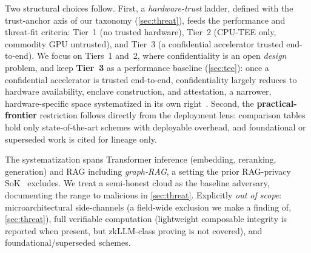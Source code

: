 Two structural choices follow. First, a \emph{hardware-trust} ladder, defined with the
trust-anchor axis of our taxonomy (\cref{sec:threat}), feeds the performance and
threat-fit criteria: Tier~1 (no trusted hardware), Tier~2 (CPU-TEE only, commodity GPU
untrusted), and Tier~3 (a confidential accelerator trusted end-to-end). We focus on
Tiers~1 and~2, where confidentiality is an open \emph{design} problem, and keep
\textbf{Tier~3} as a performance baseline (\cref{sec:tee}): once a confidential
accelerator is trusted end-to-end, confidentiality largely reduces to hardware
availability, enclave construction, and attestation, a narrower, hardware-specific
space systematized in its own right~\citep{accel_tee_sok}. Second, the
\textbf{practical-frontier} restriction follows directly from the deployment lens:
comparison tables hold only state-of-the-art schemes with deployable overhead, and
foundational or superseded work is cited for lineage only.

The systematization spans Transformer inference (embedding, reranking, generation) and
RAG including \emph{graph-RAG}, a setting the prior RAG-privacy SoK~\citep{bodea_sok}
excludes. We treat a semi-honest cloud as the baseline adversary, documenting the range
to malicious in \cref{sec:threat}. Explicitly \emph{out of scope}: microarchitectural
side-channels (a field-wide exclusion we make a finding of, \cref{sec:threat}), full
verifiable computation (lightweight composable integrity is reported when present, but zkLLM-class
proving is not covered), and foundational/superseded schemes.

